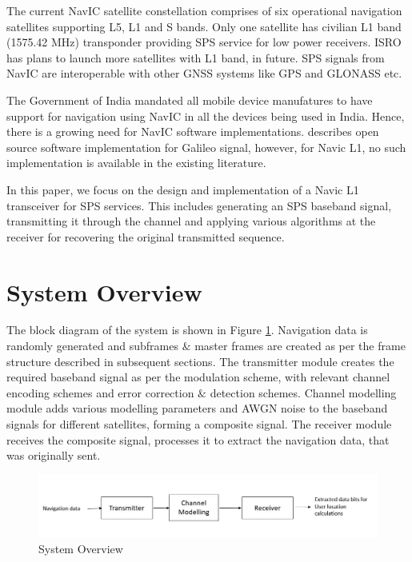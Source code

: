 \documentclass[conference]{IEEEtran}
\begin{document}
The current NavIC satellite constellation comprises of six operational navigation satellites
supporting L5, L1 and S bands. Only one satellite has civilian L1 band (1575.42 MHz) transponder providing SPS service 
for low power receivers. ISRO has plans to launch more satellites with L1 band, in future. 
SPS signals from NavIC are interoperable with other GNSS systems like GPS and GLONASS etc. 

The Government of India mandated all mobile device manufatures to have support for navigation 
using NavIC in all the devices being used in India. Hence, there is a growing need for NavIC 
software implementations. \cite{b1} describes open source software implementation for Galileo signal,
however, for Navic L1, no such implementation is available in the existing literature. 

In this paper, we 
focus on the design and implementation of a Navic L1 
transceiver for SPS services. 
This includes generating an SPS baseband signal,
transmitting it through the channel 
and applying various algorithms at the receiver for recovering the original transmitted sequence. 

\section{System Overview}
The block diagram of the system is shown in Figure \ref{fig:sim_flow}. Navigation data is randomly 
generated and subframes $\&$ master frames are created as per the frame structure described in 
subsequent sections. The transmitter module creates the required baseband signal as per the  
modulation scheme, with relevant channel encoding schemes and error correction $\&$ detection schemes. 
Channel modelling module adds various modelling parameters and AWGN noise to the baseband signals 
for different satellites, forming a composite signal. The receiver module receives the composite 
signal, processes it to extract the navigation data, that was originally sent.   


\begin{figure}[ht] 
\centering
\includegraphics[width=1\columnwidth]{figs/simulation_overview.jpg}
\centering
\caption{System Overview}
\label{fig:sim_flow}
\end{figure}
\end{document}
